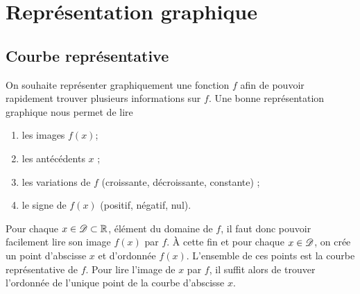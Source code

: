 \section{Représentation graphique}

\subsection{Courbe représentative}

On souhaite représenter graphiquement une fonction $f$ afin de pouvoir rapidement trouver plusieurs informations sur $f$.
Une bonne représentation graphique nous permet de lire
	\begin{enumerate}[label=$\bullet$]
		\item les images $f(x)$;
		\item les antécédents $x$ ;
		\item les variations de $f$ (croissante, décroissante, constante) ;
		\item le signe de $f(x)$ (positif, négatif, nul).
	\end{enumerate}

Pour chaque $x\in\mathcal{D}\subset\mathbb{R}$, élément du domaine de $f$, il faut donc pouvoir facilement lire son image $f(x)$ par $f$.
À cette fin et pour chaque $x\in\mathcal{D}$, on crée un point d'abscisse $x$ et d'ordonnée $f(x)$.
L'ensemble de ces points est la courbe représentative de $f$.
Pour lire l'image de $x$ par $f$, il suffit alors de trouver l'ordonnée de l'unique point de la courbe d'abscisse $x$.



